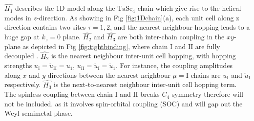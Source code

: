 $\hat{H_1}$ describes the 1D model along the $\mathrm{TaSe}_4$  chain which give rise to the helical modes in $z$-direction. As showing in Fig \ref{fig:1Dchain}(a), each  unit cell along z direction contains two sites $\tau=1, 2$, and the nearest neighbour hopping leads to a huge gap at $k_z =0$ plane. $\hat{H_2}$ and $\hat{H_3}$ are both inter-chain coupling in the $xy$-plane as depicted in Fig \ref{fig:tightbinding}, where chain $\mathrm{I}$ and $\mathrm{II}$ are fully decoupled . $\hat{H_2}$ is the nearest neighbour inter-unit cell hopping, with hopping strengths $u_\mathrm{I} = \tilde{u}_\mathrm{II} = u_1$, $u_\mathrm{II} = \tilde{u}_\mathrm{I} = \tilde{u}_1$. For instance, the coupling amplitudes along $x$ and $y$ directions between the nearest neighbour $\mu = \mathrm{I}$ chains are  $u_\mathrm{I}$ and $\tilde{u}_\mathrm{I}$ respectively. $
\hat{H_3}$ is the next-to-nearest neighbour inter-unit cell hopping term. The spinless coupling between chain $\mathrm{I}$ and $\mathrm{II}$ breaks $C_4$ symmetry therefore will not be included. as it involves spin-orbital coupling (SOC) and will gap out the Weyl semimetal phase. 

